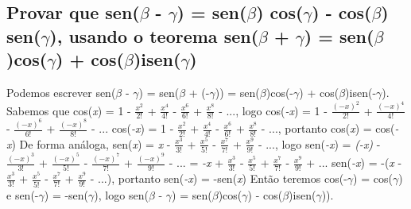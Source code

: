 \subsection{Provar que sen($\beta$ - $\gamma$) = sen($\beta$) cos($\gamma$) - cos($\beta$) sen($\gamma$), usando o teorema sen($\beta$ + $\gamma$) = sen($\beta$)cos($\gamma$) + cos($\beta$)isen($\gamma$)}
Podemos escrever
sen($\beta$ - $\gamma$) = sen($\beta$ + (-$\gamma$)) = sen($\beta$)cos(-$\gamma$) + cos($\beta$)isen(-$\gamma$).
\newline
Sabemos que cos(\textit{x}) = 1 - $\frac{x^2}{2!}$ + $\frac{x^4}{4!}$ - $\frac{x^6}{6!}$ + $\frac{x^8}{8!}$ - ..., logo 
cos(\textit{-x}) = 1 - $\frac{(-x)^2}{2!}$ + $\frac{(-x)^4}{4!}$ - $\frac{(-x)^6}{6!}$ + $\frac{(-x)^8}{8!}$ - ...\newline
cos(\textit{-x}) = 1 - $\frac{x^2}{2!}$ + $\frac{x^4}{4!}$ - $\frac{x^6}{6!}$ + $\frac{x^8}{8!}$ - ..., portanto cos(\textit{x}) = cos(\textit{-x})
\newline
De forma análoga,  sen(\textit{x}) = \textit{x} - $\frac{x^3}{3!}$ + $\frac{x^5}{5!}$ - $\frac{x^7}{7!}$ + $\frac{x^9}{9!}$ - ..., logo \newline
sen(\textit{-x}) = \textit{(-x)} - $\frac{(-x)^3}{3!}$ + $\frac{(-x)^5}{5!}$ - $\frac{(-x)^7}{7!}$ + $\frac{(-x)^9}{9!}$ - ... = \textit{-x} + $\frac{x^3}{3!}$ - $\frac{x^5}{5!}$ + $\frac{x^7}{7!}$ - $\frac{x^9}{9!}$ + ...\newline
sen(\textit{-x}) = -(\textit{x} - $\frac{x^3}{3!}$ + $\frac{x^5}{5!}$ - $\frac{x^7}{7!}$ + $\frac{x^9}{9!}$ - ...), portanto sen(\textit{-x}) = -sen(\textit{x})
\newline
Então teremos cos(-$\gamma$) = cos($\gamma$) e sen(-$\gamma$) = -sen($\gamma$), logo \newline
sen($\beta$ - $\gamma$) = sen($\beta$)cos($\gamma$) - cos($\beta$)isen($\gamma$)).


